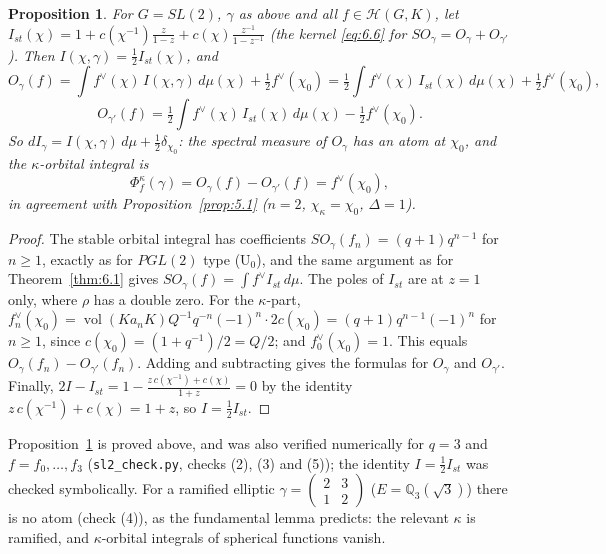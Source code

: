 \documentclass[12pt,letterpaper]{article}
\numberwithin{equation}{section}
\theoremstyle{plain}
\newtheorem{proposition}[lemma]{Proposition}
\theoremstyle{remark}
\theoremstyle{plain}
\theoremstyle{definition}
\theoremstyle{remark}
\theoremstyle{remark}
\newcommand{\Hc}{\mathcal{H}}
\DeclareMathOperator{\vol}{vol}
\begin{document}
\begin{proposition}\label{prop:6.4}
For $G=SL(2)$, $\gamma$ as above and all $f\in\Hc(G,K)$, let $I_{st}(\chi)=1+c(\chi^{-1})\frac{z}{1-z}+c(\chi)\frac{z^{-1}}{1-z^{-1}}$ (the kernel \eqref{eq:6.6} for $SO_\gamma=O_\gamma+O_{\gamma'}$). Then $I(\chi,\gamma)=\frac12I_{st}(\chi)$, and
\[
O_\gamma(f)=\int f^\vee(\chi)\,I(\chi,\gamma)\,d\mu(\chi)+\tfrac12f^\vee(\chi_0)=\tfrac12\int f^\vee(\chi)\,I_{st}(\chi)\,d\mu(\chi)+\tfrac12f^\vee(\chi_0),
\]
\[
O_{\gamma'}(f)=\tfrac12\int f^\vee(\chi)\,I_{st}(\chi)\,d\mu(\chi)-\tfrac12f^\vee(\chi_0).
\]
So $dI_\gamma=I(\chi,\gamma)\,d\mu+\frac12\delta_{\chi_0}$: the spectral measure of $O_\gamma$ has an atom at $\chi_0$, and the $\kappa$-orbital integral is
\[
\Phi^\kappa_f(\gamma)=O_\gamma(f)-O_{\gamma'}(f)=f^\vee(\chi_0),
\]
in agreement with Proposition~\ref{prop:5.1} ($n=2$, $\chi_\kappa=\chi_0$, $\Delta=1$).
\end{proposition}

\begin{proof}
The stable orbital integral has coefficients $SO_\gamma(f_n)=(q+1)q^{n-1}$ for $n\ge1$, exactly as for $PGL(2)$ type (U$_0$), and the same argument as for Theorem~\ref{thm:6.1} gives $SO_\gamma(f)=\int f^\vee I_{st}\,d\mu$. The poles of $I_{st}$ are at $z=1$ only, where $\rho$ has a double zero. For the $\kappa$-part, $f_n^\vee(\chi_0)=\vol(Ka_nK)Q^{-1}q^{-n}(-1)^n\cdot2c(\chi_0)=(q+1)q^{n-1}(-1)^n$ for $n\ge1$, since $c(\chi_0)=(1+q^{-1})/2=Q/2$; and $f_0^\vee(\chi_0)=1$. This equals $O_\gamma(f_n)-O_{\gamma'}(f_n)$. Adding and subtracting gives the formulas for $O_\gamma$ and $O_{\gamma'}$. Finally, $2I-I_{st}=1-\frac{z\,c(\chi^{-1})+c(\chi)}{1+z}=0$ by the identity $z\,c(\chi^{-1})+c(\chi)=1+z$, so $I=\frac12I_{st}$.
\end{proof}

\begin{rem26}[\S\ref{sec:6.2}]\label{r:sl2}
Proposition~\ref{prop:6.4} is proved above, and was also verified numerically for $q=3$ and $f=f_0,\dots,f_3$ (\texttt{sl2\_check.py}, checks (2), (3) and (5)); the identity $I=\frac12I_{st}$ was checked symbolically. For a ramified elliptic $\gamma=\left(\begin{smallmatrix}2&3\\1&2\end{smallmatrix}\right)$ ($E=\mathbb{Q}_3(\sqrt3)$) there is no atom (check (4)), as the fundamental lemma predicts: the relevant $\kappa$ is ramified, and $\kappa$-orbital integrals of spherical functions vanish.
\end{rem26}
\end{document}
